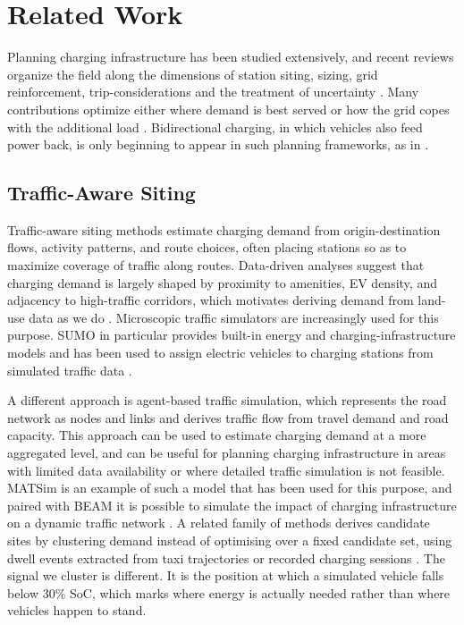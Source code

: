 \section{Related Work}
\label{sec:related_work}
Planning charging infrastructure has been studied extensively, and recent reviews organize the field along the dimensions of station siting, sizing, grid reinforcement, trip-considerations and the treatment of uncertainty \cite{review2025planning, pagany2019review}. Many contributions optimize either where demand is best served or how the grid copes with the additional load \cite{deb2019guwahati, ahmad2022location, lazari2023multiobjective, largescale2024infrastructure}. Bidirectional charging, in which vehicles also feed power back, is only beginning to appear in such planning frameworks, as in \cite{v2gplanning2023}.

\subsection{Traffic-Aware Siting}

Traffic-aware siting methods estimate charging demand from origin-destination flows, activity patterns, and route choices, often placing stations so as to maximize coverage of traffic along routes. Data-driven analyses suggest that charging demand is largely shaped by proximity to amenities, \ac{EV} density, and adjacency to high-traffic corridors, which motivates deriving demand from land-use data as we do \cite{causal2025placement}. Microscopic traffic simulators are increasingly used for this purpose. SUMO in particular provides built-in energy and charging-infrastructure models \cite{kurczveil2014sumo} and has been used to assign electric vehicles to charging stations from simulated traffic data \cite{sumoassignment2023}. 

A different approach is agent-based traffic simulation, which represents the road network as nodes and links and derives traffic flow from travel demand and road capacity. This approach can be used to estimate charging demand at a more aggregated level, and can be useful for planning charging infrastructure in areas with limited data availability or where detailed traffic simulation is not feasible. \ac{MATSim} is an example of such a model that has been used for this purpose, and paired with \ac{BEAM} it is possible to simulate the impact of charging infrastructure on a dynamic traffic network \cite{horni2016matsim, sheppard2017beam}. A related family of methods derives candidate sites by clustering demand instead of optimising over a fixed candidate set, using dwell events extracted from taxi trajectories or recorded charging sessions \cite{li2022clustering, abdullahi2024kmeans}. The signal we cluster is different. It is the position at which a simulated vehicle falls below 30\% \ac{SoC}, which marks where energy is actually needed rather than where vehicles happen to stand.



